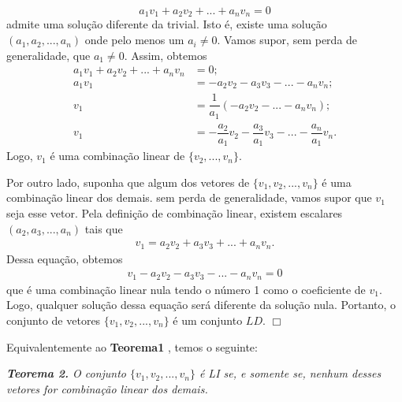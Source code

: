 \begin{equation*}
a_1v_1+a_2v_2+...+a_nv_n=0 \label{ld1}
\end{equation*}
admite uma solução diferente da trivial. Isto é, existe uma solução $( a_1, a_2,..., a_n) $ onde pelo menos um $a_i \neq 0$. Vamos supor, sem perda de generalidade, que $a_1 \neq 0$. Assim, obtemos
 \begin{align*}
a_1v_1+a_2v_2+...+a_nv_n&=0 ;\\
a_1v_1&=-a_2v_2-a_3v_3-...-a_nv_n ;\\
v_1&=\dfrac{1}{a_1}(-a_2v_2-...-a_nv_n);\\
v_1&=-\dfrac{a_2}{a_1}v_2-\dfrac{a_3}{a_1}v_3-...-\dfrac{a_n}{a_1}v_n.
\end{align*}
Logo, $v_1$ é uma combinação linear de $\{ v_2,..., v_n\}$.

Por outro lado, suponha que algum dos vetores de $\{v_1, v_2,..., v_n\}$ é uma combinação linear dos demais. sem perda de generalidade, vamos supor que $v_1$ seja esse vetor. Pela definição de combinação linear, existem escalares $( a_2, a_3, ..., a_n) $ tais que
 \begin{align*}
v_1= a_2v_2+a_3v_3+...+a_nv_n.
\end{align*}
Dessa equação, obtemos
 \begin{align*}
v_1-a_2v_2-a_3v_3-...-a_nv_n=0
\end{align*}
que é uma combinação linear nula tendo  o número 1 como o coeficiente de $v_1$. Logo, qualquer solução dessa equação será diferente da solução nula. Portanto, o conjunto de vetores $\{v_1, v_2,..., v_n\}$  é um conjunto $LD$. $\Box$

\vspace{0.3cm}

Equivalentemente ao \textbf{Teorema1} , temos o seguinte:


\vspace{0.3cm}

 \textit{\textbf{Teorema 2.}  O conjunto $\{v_1, v_2,..., v_n\}$ é LI se, e somente se, nenhum desses vetores for combinação linear dos demais.}


